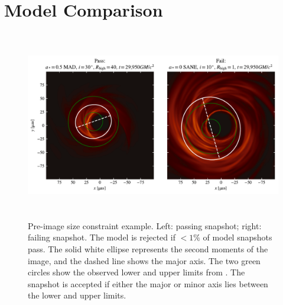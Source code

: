 \section{Model Comparison}\label{sec:comparisons}

\begin{figure}
  \centering
  \includegraphics[height=3.25in]{figures/passfail_sz.pdf}
  \caption{Pre-image size constraint example.
    Left: passing snapshot;
    right: failing snapshot.
    The model is rejected if $< 1\%$ of model snapshots pass.
    The solid white ellipse  represents the second moments of the image, and the dashed line shows the major axis.
    The two green circles show the observed lower and upper limits from .
    The snapshot is accepted if either the major or minor axis lies between the lower and upper limits.}
  \label{fig:passfail_sz}
\end{figure}

